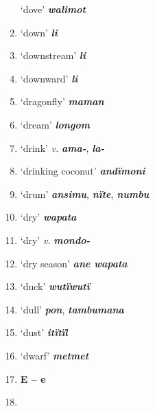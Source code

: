 \begin{enumerate}[noitemsep, label={}, align=left, widest=190, labelsep=1ex,leftmargin=*,itemindent=-10pt]
‘dove’ \textbf{\textit{walimot}} \item
‘down’ \textbf{\textit{li}} \item
‘downstream’ \textbf{\textit{li}} \item
‘downward’ \textbf{\textit{li}} \item
‘dragonfly’ \textbf{\textit{maman}} \item
‘dream’ \textbf{\textit{longom}} \item
‘drink’ \textit{v.} \textbf{\textit{ama-}}, \textbf{\textit{la-}} \item
‘drinking coconut’ \textbf{\textit{andïmoni}} \item
‘drum’ \textbf{\textit{ansimu}}, \textbf{\textit{nïte}}, \textbf{\textit{numbu}} \item
‘dry’ \textbf{\textit{wapata}} \item
‘dry’ \textit{v.} \textbf{\textit{mondo-}} \item
‘dry season’ \textbf{\textit{ane wapata}} \item
‘duck’ \textbf{\textit{wutïwutï}} \item
‘dull’ \textbf{\textit{pon}}, \textbf{\textit{tambumana}} \item
‘dust’ \textbf{\textit{itïtïl}} \item
‘dwarf’ \textbf{\textit{metmet}}\\ \item

\noindent \textbf{E – e}\\ \item


\end{enumerate}
